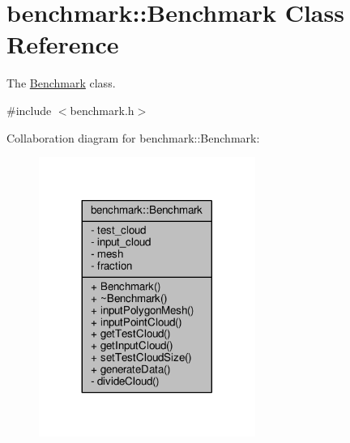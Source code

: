 \hypertarget{classbenchmark_1_1_benchmark}{}\section{benchmark\+:\+:Benchmark Class Reference}
\label{classbenchmark_1_1_benchmark}


The \hyperlink{classbenchmark_1_1_benchmark}{Benchmark} class.  




{\ttfamily \#include $<$benchmark.\+h$>$}



Collaboration diagram for benchmark\+:\+:Benchmark\+:
\nopagebreak
\begin{figure}[H]
\begin{center}
\leavevmode
\includegraphics[width=200pt]{classbenchmark_1_1_benchmark__coll__graph}
\end{center}
\end{figure}

